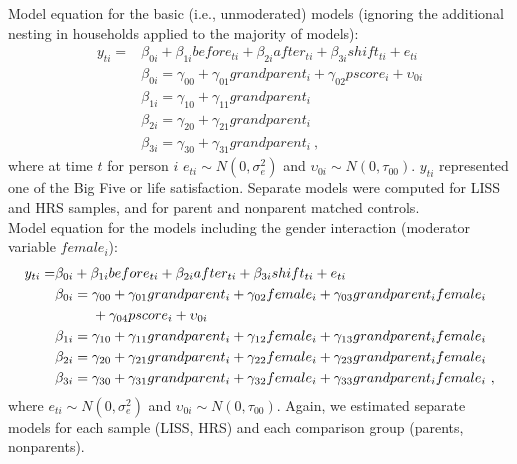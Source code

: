 \documentclass[
  english,
  man,floatsintext]{apa7}
\begin{document}
Model equation for the basic (i.e., unmoderated) models (ignoring the additional nesting in households applied to the majority of models):
\begin{equation}
\begin{split}
y_{ti} =& \beta_{0i} + \beta_{1i}before_{ti} + \beta_{2i}after_{ti} + \beta_{3i}shift_{ti} + e_{ti} \\
 & \beta_{0i} = \gamma_{00} + \gamma_{01}grandparent_i + \gamma_{02}pscore_i + \upsilon_{0i} \\
 & \beta_{1i} = \gamma_{10} + \gamma_{11}grandparent_i \\
 & \beta_{2i} = \gamma_{20} + \gamma_{21}grandparent_i \\
 & \beta_{3i} = \gamma_{30} + \gamma_{31}grandparent_i\ ,
\end{split}
\label{eq:mlm1}
\end{equation}
where at time \(t\) for person \(i\) \(e_{ti} \sim N(0, \sigma_e^2)\) and \(\upsilon_{0i} \sim N(0, \tau_{00})\). \(y_{ti}\) represented one of the Big Five or life satisfaction. Separate models were computed for LISS and HRS samples, and for parent and nonparent matched controls.\\
Model equation for the models including the gender interaction (moderator variable \(female_i\)):
\begin{equation}
\begin{split}
y_{ti} =& \beta_{0i} + \beta_{1i}before_{ti} + \beta_{2i}after_{ti} + \beta_{3i}shift_{ti} + e_{ti} \\
 & \beta_{0i} = \gamma_{00} + \gamma_{01}grandparent_i + \gamma_{02}female_i + \gamma_{03}grandparent_{i}female_{i} \\
 & \hphantom{{}=\beta_{0i}}+ \gamma_{04}pscore_i + \upsilon_{0i} \\
 & \beta_{1i} = \gamma_{10} + \gamma_{11}grandparent_i + \gamma_{12}female_i + \gamma_{13}grandparent_{i}female_{i} \\
 & \beta_{2i} = \gamma_{20} + \gamma_{21}grandparent_i + \gamma_{22}female_i + \gamma_{23}grandparent_{i}female_{i} \\
 & \beta_{3i} = \gamma_{30} + \gamma_{31}grandparent_i + \gamma_{32}female_i + \gamma_{33}grandparent_{i}female_{i}\ ,
\end{split}
  \label{eq:mlm2}
\end{equation}
where \(e_{ti} \sim N(0, \sigma_e^2)\) and \(\upsilon_{0i} \sim N(0, \tau_{00})\). Again, we estimated separate models for each sample (LISS, HRS) and each comparison group (parents, nonparents).\\
\end{document}
